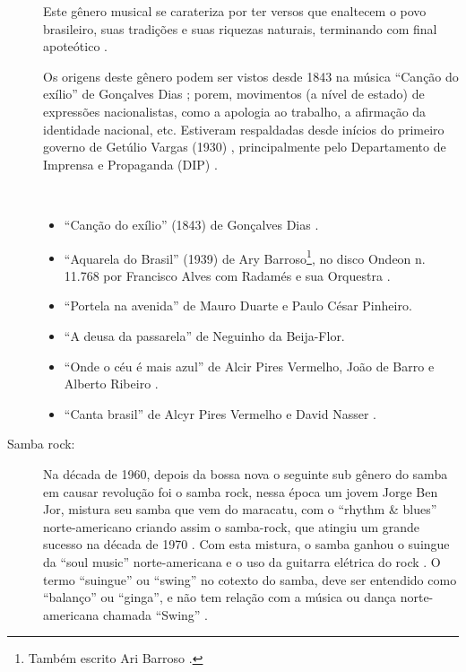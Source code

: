 \begin{description}
Este gênero musical se carateriza por ter versos que enaltecem o povo brasileiro, 
suas tradições e suas riquezas naturais, terminando com final apoteótico  \cite[pp. 73]{diniz2006almanaque}.

Os origens deste gênero podem ser vistos desde 1843 na música ``Canção do exílio'' de Gonçalves Dias \cite[pp. 128]{perna2002samba};
porem, movimentos (a nível de estado) de expressões nacionalistas, como a apologia ao trabalho,
a afirmação da identidade nacional, etc.
Estiveram respaldadas desde inícios do primeiro governo de Getúlio Vargas (1930) \cite[pp. 67]{haussen2001radio},
principalmente pelo Departamento de Imprensa e Propaganda (DIP) \cite[pp. 74]{fenerick2005nem}.
\begin{example} ~

\begin{itemize}
\item ``Canção do exílio'' (1843) de Gonçalves Dias \cite[pp. 128]{perna2002samba}.
\item ``Aquarela do Brasil'' (1939) de Ary Barroso\footnote{Também escrito Ari Barroso  \cite[pp. 685]{marcondes1977enciclopediav2}.},
no disco Ondeon n. 11.768 por Francisco Alves com Radamés e sua Orquestra  \cite[pp. 685]{marcondes1977enciclopediav2} \cite[pp. 73]{diniz2006almanaque} \cite[pp. 128]{perna2002samba}.
\item ``Portela na avenida''  de Mauro Duarte e Paulo César Pinheiro.
\item ``A deusa da passarela'' de Neguinho da Beija-Flor.
\item ``Onde o céu é mais azul'' de Alcir Pires Vermelho, João de Barro e Alberto Ribeiro \cite[pp. 67]{haussen2001radio}.
\item ``Canta brasil'' de Alcyr Pires Vermelho e David Nasser \cite[pp. 53]{chediak2004101}.
\end{itemize}
\end{example}

\item[Samba rock:] 

Na década de 1960, depois da bossa nova o seguinte sub gênero do samba em causar revolução foi o samba rock,
nessa época um jovem Jorge Ben Jor, mistura seu samba que vem do maracatu,
com o ``rhythm \& blues'' norte-americano criando assim o samba-rock, 
que atingiu um grande sucesso na década de 1970 \cite{petillo2012curtindo} \cite[pp. 166]{sanches2000tropicalismo}.
Com esta mistura, 
o samba ganhou o suingue da  ``soul music'' norte-americana 
e o uso da guitarra elétrica do rock  \cite{petillo2012curtindo}.
O termo ``suingue'' ou ``swing'' no cotexto do samba, 
deve ser entendido como ``balanço'' ou ``ginga'', 
e não tem relação com a música ou dança norte-americana chamada ``Swing'' \cite[pp. 131]{perna2002samba}. 


\end{description}
